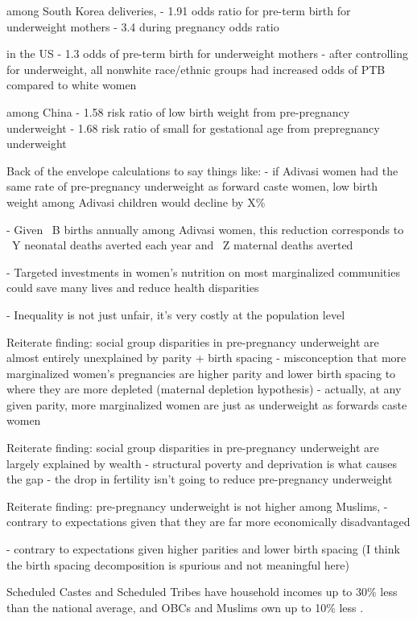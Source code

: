 \cite{hur2009512} among South Korea deliveries, 
- 1.91 odds ratio for pre-term birth for underweight mothers
- 3.4 during pregnancy odds ratio

\cite{diamond2024impact} in the US
- 1.3 odds of pre-term birth for underweight mothers 
- after controlling for underweight, all nonwhite race/ethnic groups had increased odds of PTB compared to white women

\cite{wenman2004prospective} among China 
- 1.58 risk ratio of low birth weight from pre-pregnancy underweight
- 1.68 risk ratio of small for gestational age from prepregnancy underweight


Back of the envelope calculations to say things like:
- if Adivasi women had the same rate of pre-pregnancy underweight as forward caste women, low birth weight among Adivasi children would decline by X\%


- Given ~B births annually among Adivasi women, this reduction corresponds to ~Y neonatal deaths averted each year and ~Z maternal deaths averted

- Targeted investments in women's nutrition on most marginalized communities could save many lives and reduce health disparities

- Inequality is not just unfair, it's very costly at the population level

Reiterate finding: social group disparities in pre-pregnancy underweight are almost entirely unexplained by parity + birth spacing
- misconception that more marginalized women's pregnancies are higher parity and lower birth spacing to where they are more depleted (maternal depletion hypothesis) 
- actually, at any given parity, more marginalized women are just as underweight as forwards caste women

Reiterate finding: social group disparities in pre-pregnancy underweight are largely explained by wealth
- structural poverty and deprivation is what causes the gap
- the drop in fertility isn't going to reduce pre-pregnancy underweight


Reiterate finding: pre-pregnancy underweight is not higher among Muslims,
- contrary to expectations given that they are far more economically disadvantaged

- contrary to expectations given higher parities and lower birth spacing (I think the birth spacing decomposition is spurious and not meaningful here)



Scheduled Castes and Scheduled Tribes have household incomes up to 30\% less than the national average, and OBCs and Muslims own up to 10\% less \citep{bharti2018wealth}.



